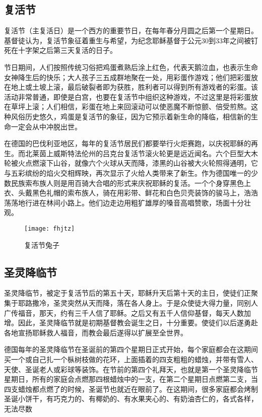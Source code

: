 \subsection{复活节}
\par
复活节（主复活日）是一个西方的重要节日，在每年春分月圆之后第一个星期日。基督徒认为，复活节象征着重生与希望，为纪念耶稣基督于公元30到33年之间被钉死在十字架之后第三天复活的日子。
\par
节日期间，人们按照传统习俗把鸡蛋煮熟后涂上红色，代表天鹅泣血，也表示生命女神降生后的快乐；大人孩子三五成群地聚在一处，用彩蛋作游戏；他们把彩蛋放在地上或土坡上滚，最后破裂者即为获胜，胜利者可以得到所有游戏者的彩蛋。该活动非常普通，即使是白宫，也要在复活节中组织这种游戏，不过这里是将彩蛋放在草坪上滚；人们相信，彩蛋在地上来回滚动可以使恶魔不断惊颤、倍受煎熬。这种风俗历史悠久，鸡蛋是复活节的象征，因为它预示着新生命的降临，相信新的生命一定会从中冲脱出世。
\par
在德国的巴伐利亚地区，每年的复活节居民们都要举行火炬赛跑，以庆祝耶稣的再生。而北莱茵上威斯特法伦州的吕克台复活节滚火轮更是远近闻名。六个巨型大木轮被火点燃滚下山谷，就像六个火球从天而降，漆黑的山谷被大火轮照得通明，它与五彩缤纷的焰火交相辉映，再次显示了火给人类带来了新生。作为德国唯一的少数民族索布族人则是用百骑大合唱的形式来庆祝耶稣的复活。一个个身穿黑色上衣、头戴黑色礼帽的索布族人，骑在用彩带、鲜花和白色贝壳装饰的骏马上，浩浩荡荡地行进在林间小路上。他们边走边用粗犷雄厚的嗓音高唱赞歌，场面十分壮观。
\begin{figure}[htb]
    \centering
    \texttt{[image: fhjtz]}
    \caption{复活节兔子}
    
\end{figure}

\subsection{圣灵降临节}
\par
圣灵降临节，被定于复活节后的第五十天，耶稣升天后第十天的主日，使徒们正聚集于耶路撒冷，圣灵突然从天而降，落在各人身上。于是众使徒大得力量，同别人广传福音，那天，约有三千人信了耶稣。之后又有五千人信仰基督，每天人数加增。因此，圣灵降临节就是初期基督教会诞生之日，十分重要。使徒们以后遂勇赴各地宣扬耶稣救人福音，而教会最后遂得以扩展至全世界。
\par
德国每年的圣灵降临节在圣诞前的第四个星期日正式开始，每个家庭都会在这期间买一个或自己扎一个枞树枝做的花环，上面插着的四支粗粗的蜡烛，并带有雪人、天使、圣诞老人或彩球等装饰。在节前的第四个礼拜天，也就是第一个圣灵降临节星期日，所有的家庭会点燃那四根蜡烛中的一支，在第二个星期日点燃第二支，当四支蜡烛都点燃了的时候，圣诞节也就近在眼前了。在这期间，很多家庭都会烤制圣诞小饼干，有巧克力的、有椰奶的、有水果夹心的、有奶油杏仁的，各式各样，无法尽数